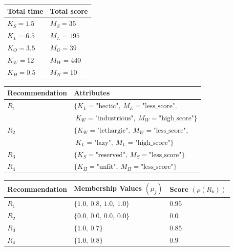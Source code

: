 \documentclass[conference]{IEEEtran}
\begin{document}
\begin{table}
\small
{}
\begin{center}
\def\arraystretch{1.7}
\begin{tabular}{| l | l |}
\hline
\bf Total time & \bf Total score \\
\hline
$K_S=1.5$ & $M_S=35$ \\
\hline
$K_L=6.5$ & $M_L=195$ \\
\hline
$K_O=3.5$ & $M_O=39$ \\
\hline
$K_W=12$ & $M_W=440$ \\
\hline
$K_H=0.5$ & $M_H=10$ \\
\hline
\end{tabular}
\end{center}
\end{table}
\begin{table}
\small
{}
\begin{center}
\def\arraystretch{1.7}
\begin{tabular}{| l | l |}
\hline
\bf Recommendation & \bf Attributes \\
\hline
$R_1$ & $\{K_L = \text{"hectic"},\ M_L = \text{"less\_score"},$\\&$\ K_W=\text{"industrious"},\ M_W=\text{"high\_score"}\}$ \\
\hline
$R_2$ & $\{K_W = \text{"lethargic"},\ M_W = \text{"less\_score"},$\\& $\ K_L=\text{"lazy"},\ M_L=\text{"high\_score"}\}$ \\
\hline
$R_3$ & $\{K_S = \text{"reserved"},\ M_S = \text{"less\_score"}\}$ \\
\hline
$R_4$ & $\{K_H = \text{"unfit"},\ M_H = \text{"less\_score"}\}$ \\
\hline
\end{tabular}
\end{center}
\end{table}
\begin{table}
\small
{}
\begin{center}
\def\arraystretch{1.7}
\begin{tabular}{| l | l | l |}
\hline
\bf Recommendation & \bf Membership Values $(\mu_{j})$ & \bf Score $(\rho(R_k))$ \\
\hline
$R_1$ & $\{1.0,\ 0.8,\ 1.0,\ 1.0\}$ & $0.95$ \\
\hline
$R_2$ & $\{0.0,\ 0.0,\ 0.0,\ 0.0\}$ & $0.0$ \\
\hline
$R_3$ & $\{1.0,\ 0.7\}$ & $0.85$ \\
\hline
$R_4$ & $\{1.0,\ 0.8\}$ & $0.9$ \\
\hline
\end{tabular}
\end{center}
\end{table}
\end{document}
